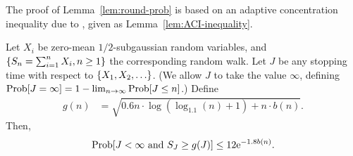 The proof of Lemma~\ref{lem:round-prob} is based on an adaptive
concentration inequality due to \cite{zhao2016adaptive},
given as Lemma~\ref{lem:ACI-inequality}.

\begin{lemma}
\label{lem:ACI-inequality}
Let $X_i$ be zero-mean $1/2$-subgaussian random variables,
and $\{ S_n = \sum_{i=1}^n X_i, n \geq 1 \}$ the corresponding random walk.
Let $J$ be any stopping time with respect to $\{ X_1, X_2, \ldots \}$.
(We allow $J$ to take the value $\infty$,
defining $\Prob{J = \infty} = 1 - \lim_{n \to \infty} \Prob{J \leq n}$.)
Define 
\begin{align*}
g(n) & = \sqrt{0.6 n \cdot \log (\log_{1.1}(n) + 1) + n \cdot b(n)}.
\end{align*}
Then, 
\begin{align*}
\Prob{J < \infty \mbox{ and } S_J \geq g(J)} \leq 12 \e^{-1.8 b(n)}.
\end{align*}
\end{lemma}

